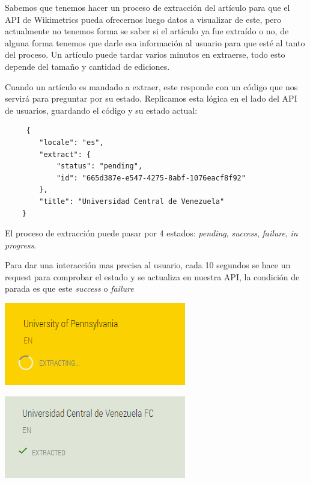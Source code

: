 \begin{enumerate}
  Sabemos que tenemos hacer un proceso de extracción del artículo para que el API de Wikimetrics pueda ofrecernos luego datos a visualizar de este, pero actualmente no tenemos forma se saber si el artículo ya fue extraído o no, de alguna forma tenemos que darle esa información al usuario para que esté al tanto del proceso. Un artículo puede tardar varios minutos en extraerse, todo esto depende del tamaño y cantidad de ediciones.
 
  Cuando un artículo es mandado a extraer, este responde con un código que nos servirá para preguntar por su estado. Replicamos esta lógica en el lado del API de usuarios, guardando el código y su estado actual:
  \begin{verbatim}
     {
        "locale": "es",
        "extract": {
            "status": "pending",
            "id": "665d387e-e547-4275-8abf-1076eacf8f92"
        },
        "title": "Universidad Central de Venezuela"
    }
  \end{verbatim}
  
  El proceso de extracción puede pasar por 4 estados: \textit{pending}, \textit{success}, \textit{failure}, \textit{in progress}.
  
  Para dar una interacción mas precisa al usuario, cada 10 segundos se hace un request para comprobar el estado y se actualiza en nuestra API, la condición de parada es que este \textit{success} o \textit{failure}
  
  \begin{center}
      \bigbreak
      \includegraphics{images/marco_aplicativo/article_pending.png}
      \label{fig:article_pending}
      \bigbreak
  \end{center}
  \begin{center}
      \bigbreak
      \includegraphics{images/marco_aplicativo/article_extracted.png}
      \label{fig:article_success}
      \bigbreak
  \end{center} 
  

\end{enumerate}
